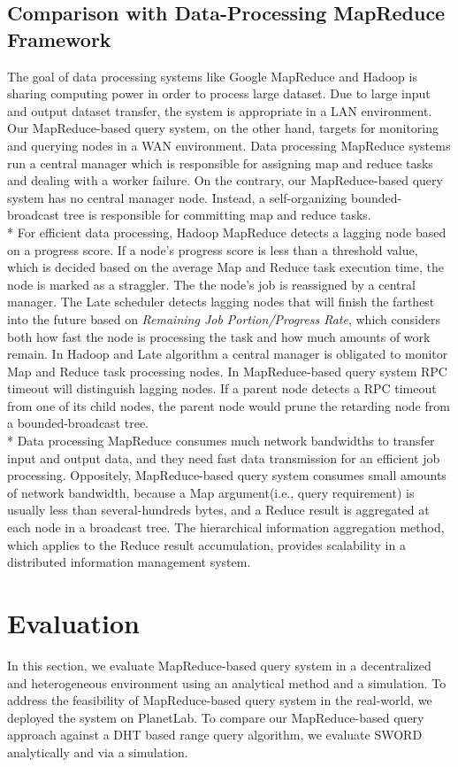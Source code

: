 \documentclass{acm_proc_article-sp}
\begin{document}
\subsection{Comparison with Data-Processing MapReduce Framework}
The goal of data processing systems like Google MapReduce\cite{google_mapreduce} and Hadoop\cite{hadoop} is sharing computing power in order to process large dataset. 
Due to large input and output dataset transfer, the system is appropriate in a LAN environment.
Our MapReduce-based query system, on the other hand, targets for monitoring and querying nodes in a WAN environment.
Data processing MapReduce systems run a central manager which is responsible for assigning map and reduce tasks and dealing with a  worker failure.
On the contrary, our MapReduce-based query system has no central manager node. Instead, a self-organizing bounded-broadcast tree is responsible for committing map and reduce tasks.\\*
For efficient data processing, Hadoop MapReduce detects a lagging node based on a progress score.
If a node's progress score is less than a threshold value, which is decided based on the average Map and Reduce task execution time, the node is marked as a straggler. The the node's job is reassigned by a central manager.
The Late scheduler\cite{late} detects lagging nodes that will finish the farthest into the future based on \textit{Remaining Job Portion/Progress Rate}, which considers both
how fast the node is processing the task and how much amounts of work remain. 
In Hadoop and Late algorithm a central manager is obligated to monitor Map and Reduce task processing nodes. 
In MapReduce-based query system RPC timeout will distinguish lagging nodes. If a parent node detects a RPC timeout from one of its child nodes, the parent node would prune the retarding node from a bounded-broadcast tree.\\*
Data processing MapReduce consumes much network bandwidths to transfer input and output data, and they need fast data transmission for an efficient job processing. 
Oppositely, MapReduce-based query system consumes small amounts of network bandwidth, because a Map argument(i.e., query requirement) is usually less than several-hundreds bytes, and a Reduce result is aggregated at each node in a broadcast tree.
The hierarchical information aggregation method, which applies to the Reduce result accumulation, provides scalability in a distributed information management system\cite{astrobe}\cite{treedatamanage}.
\section{Evaluation}
In this section, we evaluate MapReduce-based query system in a decentralized and heterogeneous environment using an analytical method and a simulation. 
To address the feasibility of MapReduce-based query system in the real-world, we deployed the system on PlanetLab. 
To compare our MapReduce-based query approach against a DHT based range query algorithm, we evaluate SWORD\cite{sword} analytically and via a simulation.
\end{document}
